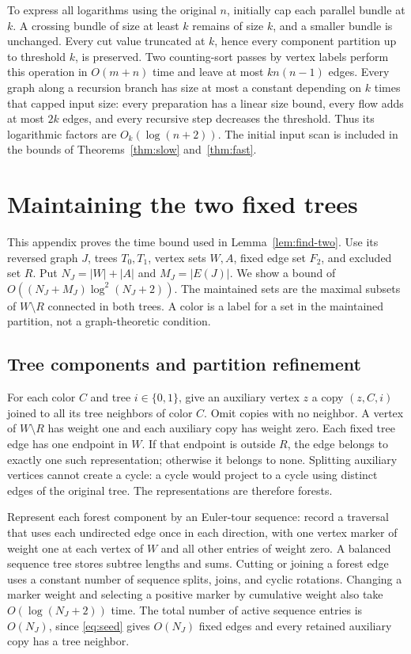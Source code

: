 \documentclass[11pt]{article}
\theoremstyle{definition}
\theoremstyle{remark}
\begin{document}
To express all logarithms using the original \(n\), initially cap each parallel bundle at \(k\). A crossing bundle of size at least \(k\) remains of size \(k\), and a smaller bundle is unchanged. Every cut value truncated at \(k\), hence every component partition up to threshold \(k\), is preserved. Two counting-sort passes by vertex labels perform this operation in \(O(m+n)\) time and leave at most \(kn(n-1)\) edges. Every graph along a recursion branch has size at most a constant depending on \(k\) times that capped input size: every preparation has a linear size bound, every flow adds at most \(2k\) edges, and every recursive step decreases the threshold. Thus its logarithmic factors are \(O_k(\log(n+2))\). The initial input scan is included in the bounds of Theorems~\ref{thm:slow} and~\ref{thm:fast}.

\appendix
\section{Maintaining the two fixed trees}
\label{app:implementation}
This appendix proves the time bound used in Lemma~\ref{lem:find-two}. Use its reversed graph \(J\), trees \(T_0,T_1\), vertex sets \(W,A\), fixed edge set \(F_2\), and excluded set \(R\). Put \(N_J=|W|+|A|\) and \(M_J=|E(J)|\). We show a bound of \(O((N_J+M_J)\log^2(N_J+2))\). The maintained sets are the maximal subsets of \(W\setminus R\) connected in both trees. A color is a label for a set in the maintained partition, not a graph-theoretic condition.

\subsection{Tree components and partition refinement}
For each color \(C\) and tree \(i\in\{0,1\}\), give an auxiliary vertex \(z\) a copy \((z,C,i)\) joined to all its tree neighbors of color \(C\). Omit copies with no neighbor. A vertex of \(W\setminus R\) has weight one and each auxiliary copy has weight zero. Each fixed tree edge has one endpoint in \(W\). If that endpoint is outside \(R\), the edge belongs to exactly one such representation; otherwise it belongs to none. Splitting auxiliary vertices cannot create a cycle: a cycle would project to a cycle using distinct edges of the original tree. The representations are therefore forests.

Represent each forest component by an Euler-tour sequence: record a traversal that uses each undirected edge once in each direction, with one vertex marker of weight one at each vertex of \(W\) and all other entries of weight zero. A balanced sequence tree stores subtree lengths and sums. Cutting or joining a forest edge uses a constant number of sequence splits, joins, and cyclic rotations. Changing a marker weight and selecting a positive marker by cumulative weight also take \(O(\log(N_J+2))\) time. The total number of active sequence entries is \(O(N_J)\), since \eqref{eq:seed} gives \(O(N_J)\) fixed edges and every retained auxiliary copy has a tree neighbor.
\end{document}

